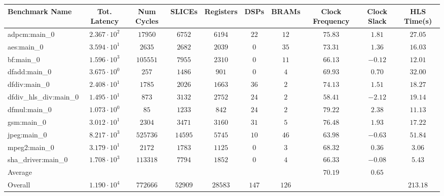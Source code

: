 \begin{tabular}{|l|c|c|c|c|c|c|c|c|c|}
\hline
Benchmark Name          & Tot. Latency           & Num Cycles & SLICEs    & Registers & DSPs    & BRAMs   & Clock Frequency & Clock Slack & HLS Time(s) \\
\hline
adpcm:main\_0           & $ 2.367 \cdot 10^{2} $ & $ 17950  $ & $ 6752  $ & $ 6194  $ & $ 22  $ & $ 12  $ & $ 75.83       $ & $ 1.81    $ & $ 27.05   $ \\
aes:main\_0             & $ 3.594 \cdot 10^{1} $ & $ 2635   $ & $ 2682  $ & $ 2039  $ & $ 0   $ & $ 35  $ & $ 73.31       $ & $ 1.36    $ & $ 16.03   $ \\
bf:main\_0              & $ 1.596 \cdot 10^{3} $ & $ 105551 $ & $ 7955  $ & $ 2310  $ & $ 0   $ & $ 11  $ & $ 66.13       $ & $ -0.12   $ & $ 12.01   $ \\
dfadd:main\_0           & $ 3.675 \cdot 10^{0} $ & $ 257    $ & $ 1486  $ & $ 901   $ & $ 0   $ & $ 4   $ & $ 69.93       $ & $ 0.70    $ & $ 32.00   $ \\
dfdiv:main\_0           & $ 2.408 \cdot 10^{1} $ & $ 1785   $ & $ 2026  $ & $ 1663  $ & $ 36  $ & $ 2   $ & $ 74.13       $ & $ 1.51    $ & $ 18.27   $ \\
dfdiv\_hls\_div:main\_0 & $ 1.495 \cdot 10^{1} $ & $ 873    $ & $ 3132  $ & $ 2752  $ & $ 24  $ & $ 2   $ & $ 58.41       $ & $ -2.12   $ & $ 19.14   $ \\
dfmul:main\_0           & $ 1.073 \cdot 10^{0} $ & $ 85     $ & $ 1233  $ & $ 842   $ & $ 24  $ & $ 2   $ & $ 79.22       $ & $ 2.38    $ & $ 11.13   $ \\
gsm:main\_0             & $ 3.012 \cdot 10^{1} $ & $ 2304   $ & $ 3471  $ & $ 3160  $ & $ 31  $ & $ 5   $ & $ 76.48       $ & $ 1.93    $ & $ 17.22   $ \\
jpeg:main\_0            & $ 8.217 \cdot 10^{3} $ & $ 525736 $ & $ 14595 $ & $ 5745  $ & $ 10  $ & $ 46  $ & $ 63.98       $ & $ -0.63   $ & $ 51.84   $ \\
mpeg2:main\_0           & $ 3.179 \cdot 10^{1} $ & $ 2172   $ & $ 1783  $ & $ 1125  $ & $ 0   $ & $ 3   $ & $ 68.32       $ & $ 0.36    $ & $ 3.06    $ \\
sha\_driver:main\_0     & $ 1.708 \cdot 10^{3} $ & $ 113318 $ & $ 7794  $ & $ 1852  $ & $ 0   $ & $ 4   $ & $ 66.33       $ & $ -0.08   $ & $ 5.43    $ \\
\hline
Average                 & $                    $ & $        $ & $       $ & $       $ & $     $ & $     $ & $ 70.19       $ & $ 0.65    $ & $         $ \\
\hline
Overall                 & $ 1.190 \cdot 10^{4} $ & $ 772666 $ & $ 52909 $ & $ 28583 $ & $ 147 $ & $ 126 $ & $             $ & $         $ & $ 213.18  $ \\
\hline
\end{tabular}
